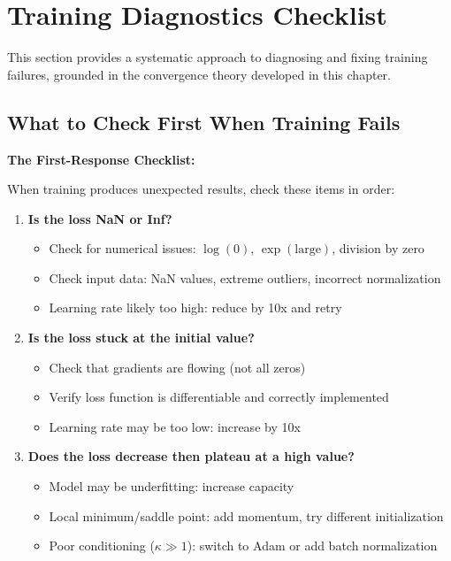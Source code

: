 \documentclass[../../main.tex]{subfiles}
\begin{document}
\section{Training Diagnostics Checklist}
\label{sec:training-diagnostics-commented}

This section provides a systematic approach to diagnosing and fixing training failures, grounded in the convergence theory developed in this chapter.

\subsection{What to Check First When Training Fails}

\begin{principle}
\textbf{The First-Response Checklist:}

When training produces unexpected results, check these items in order:

\begin{enumerate}
    \item \textbf{Is the loss NaN or Inf?}
    \begin{itemize}
        \item Check for numerical issues: $\log(0)$, $\exp(\text{large})$, division by zero
        \item Check input data: NaN values, extreme outliers, incorrect normalization
        \item Learning rate likely too high: reduce by 10x and retry
    \end{itemize}

    \item \textbf{Is the loss stuck at the initial value?}
    \begin{itemize}
        \item Check that gradients are flowing (not all zeros)
        \item Verify loss function is differentiable and correctly implemented
        \item Learning rate may be too low: increase by 10x
    \end{itemize}

    \item \textbf{Does the loss decrease then plateau at a high value?}
    \begin{itemize}
        \item Model may be underfitting: increase capacity
        \item Local minimum/saddle point: add momentum, try different initialization
        \item Poor conditioning ($\kappa \gg 1$): switch to Adam or add batch normalization
    \end{itemize}


\end{enumerate}
\end{principle}
\end{document}
